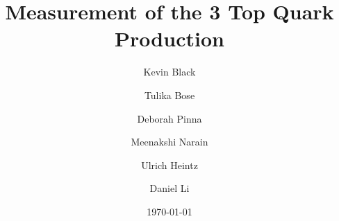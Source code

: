 


\newcommand{\todo}[1]{\typeout{[WARNING]Todo: #1}}
\newcommand{\ptratio}{\ensuremath{p_{\mathrm{T}}^{ratio}}\xspace}




\title{Measurement of the 3 Top Quark Production}





\address[wisc]{University of Wisconsin-Madison}
\address[brown]{Brown University}

\author[wisc]{Kevin Black}
\author[wisc]{Tulika Bose}
\author[wisc]{Deborah Pinna}

\author[brown]{Meenakshi Narain}
\author[brown]{Ulrich Heintz}
\author[brown]{Daniel Li}




\date{\today}






